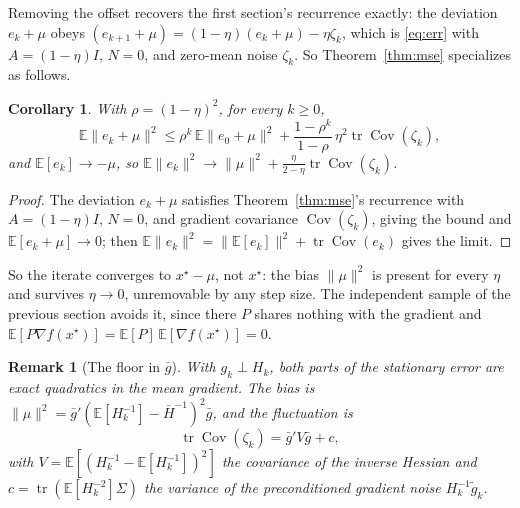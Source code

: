 \documentclass[11pt]{article}
\newcommand{\Hbar}{\bar{H}}
\newcommand{\gbar}{\bar{g}}
\newcommand{\E}{\mathbb{E}}
\newcommand{\tr}{\operatorname{tr}}
\newtheorem{corollary}{Corollary}
\newtheorem{remark}{Remark}
\begin{document}
Removing the offset recovers the first section's recurrence exactly: the deviation
$e_k+\mu$ obeys $(e_{k+1}+\mu)=(1-\eta)(e_k+\mu)-\eta\zeta_k$, which is
\eqref{eq:err} with $A=(1-\eta)I$, $N=0$, and zero-mean noise $\zeta_k$. So
Theorem~\ref{thm:mse} specializes as follows.

\begin{corollary}\label{cor:same}
    With $\rho=(1-\eta)^2$, for every $k\ge0$,
    \[
        \E\|e_k+\mu\|^2\le\rho^k\,\E\|e_0+\mu\|^2
        +\frac{1-\rho^k}{1-\rho}\,\eta^2\tr\operatorname{Cov}(\zeta_k),
    \]
    and $\E[e_k]\to-\mu$, so
    $\E\|e_k\|^2\to\|\mu\|^2+\frac{\eta}{2-\eta}\tr\operatorname{Cov}(\zeta_k)$.
\end{corollary}

\begin{proof}
    The deviation $e_k+\mu$ satisfies Theorem~\ref{thm:mse}'s recurrence with
    $A=(1-\eta)I$, $N=0$, and gradient covariance $\operatorname{Cov}(\zeta_k)$,
    giving the bound and $\E[e_k+\mu]\to0$; then
    $\E\|e_k\|^2=\|\E[e_k]\|^2+\tr\operatorname{Cov}(e_k)$ gives the limit.
\end{proof}

So the iterate converges to $x^\star-\mu$, not $x^\star$: the bias $\|\mu\|^2$ is
present for every $\eta$ and survives $\eta\to0$, unremovable by any step size.
The independent sample of the previous section avoids it, since there $P$ shares
nothing with the gradient and $\E[P\nabla f(x^\star)]=\E[P]\,\E[\nabla f(x^\star)]=0$.

\begin{remark}[The floor in $\gbar$]
    With $g_k\perp H_k$, both parts of the stationary error are exact quadratics in
    the mean gradient. The bias is
    $\|\mu\|^2=\gbar'(\E[H_k^{-1}]-\Hbar^{-1})^2\gbar$, and the fluctuation is
    \[
        \tr\operatorname{Cov}(\zeta_k)=\gbar'V\gbar+c,
    \]
    with $V=\E[(H_k^{-1}-\E[H_k^{-1}])^2]$ the covariance of the inverse Hessian and
    $c=\tr(\E[H_k^{-2}]\Sigma)$ the variance of the preconditioned gradient noise
    $H_k^{-1}\tilde g_k$.
\end{remark}
\end{document}
